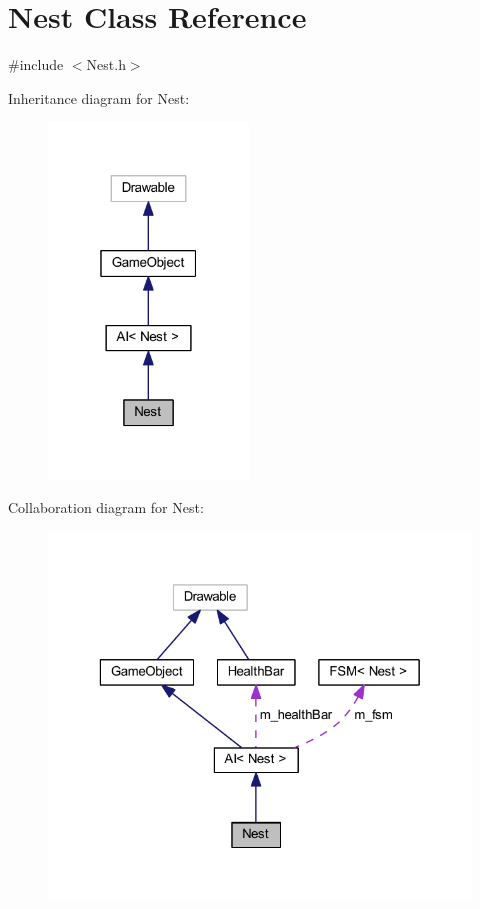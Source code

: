 \hypertarget{class_nest}{}\section{Nest Class Reference}
\label{class_nest}


{\ttfamily \#include $<$Nest.\+h$>$}



Inheritance diagram for Nest\+:
\nopagebreak
\begin{figure}[H]
\begin{center}
\leavevmode
\includegraphics[width=151pt]{class_nest__inherit__graph}
\end{center}
\end{figure}


Collaboration diagram for Nest\+:
\nopagebreak
\begin{figure}[H]
\begin{center}
\leavevmode
\includegraphics[width=323pt]{class_nest__coll__graph}
\end{center}
\end{figure}
